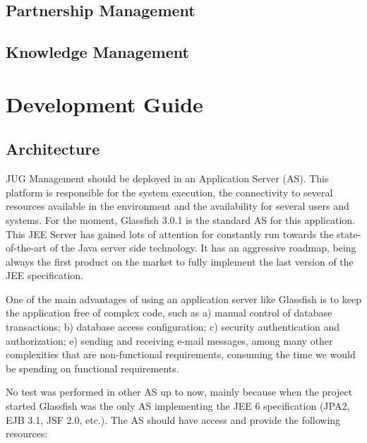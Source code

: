 \documentclass[envcountsame,envcountchap]{svmono}
\begin{document}
\chapter{Partnership Management}

\chapter{Knowledge Management}

\part{Development Guide}

\chapter{Architecture}

JUG Management should be deployed in an Application Server (AS). This platform is responsible for the system execution, the connectivity to several resources available in the environment and the availability for several users and systems. For the moment, Glassfish 3.0.1 is the standard AS for this application. This JEE Server has gained lots of attention for constantly run towards the state-of-the-art of the Java server side technology. It has an aggressive roadmap, being always the first product on the market to fully implement the last version of the JEE specification.

One of the main advantages of using an application server like Glassfish is to keep the application free of complex code, such as a) manual control of database transactions; b) database access configuration; c) security authentication and authorization; e) sending and receiving e-mail messages, among many other complexities that are non-functional requirements, consuming the time we would be spending on functional requirements.

No test was performed in other AS up to now, mainly because when the project started Glassfish was the only AS implementing the JEE 6 specification (JPA2, EJB 3.1, JSF 2.0, etc.). The AS should have access and provide the following resources:
\end{document}
